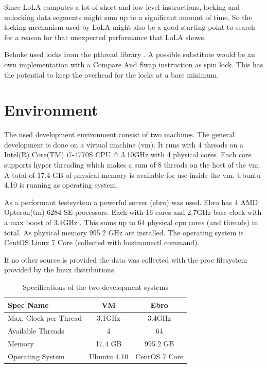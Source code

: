 Since LoLA computes a lot of short and low level instructions, locking and unlocking data segments might sum up to a significant amount of time. So the locking mechanism used by LoLA might also be a good starting point to search for a reason for that unexpected performance that LoLA shows.

Behnke used locks from the pthread library \cite{?}. A possible substitute would be an own implementation with a Compare And Swap instruction as spin lock. This has the potential to keep the overhead for the locks at a bare minimum.

\section{Environment}
\label{env}
The used development environment consist of two machines. The general development is done on a virtual machine (vm). It runs with 4 threads on a Intel(R) Core(TM) i7-4770S CPU @ 3.10GHz with 4 physical cores. Each core supports hyper threading which makes a sum of 8 threads on the host of the vm. A total of 17.4 GB of physical memory is available for use inside the vm. Ubuntu 4.10 is running as operating system.

As a performant testsystem a powerful server (ebro) was used. Ebro has 4 AMD Opteron(tm) 6284 SE processors. Each with 16 cores and 2.7GHz base clock with a max boost of 3.4GHz \cite{AMDSpecs}. This sums up to 64 physical cpu cores (and threads) in total. As physical memory 995.2 GHz are installed. The operating system is CentOS Linux 7 Core (collected with hostnamectl command).

If no other source is provided the data was collected with the proc filesystem provided by the linux distributions.
\begin{center}
    \begin{table}[H]
        \centering
        \begin{tabular}{ | l | c | c |}
            \hline
            \textbf{Spec Name} & \textbf{VM} & \textbf{Ebro} \\ \hline
            Max. Clock per Thread & 3.1GHz & 3.4GHz \\ 
            Available Threads & 4 & 64 \\ 
            Memory & 17.4 GB & 995.2 GB\\ 
            Operating System & Ubuntu 4.10 & CentOS 7 Core \\ \hline
        \end{tabular}
        \caption{Specifications of the two development systems}
    \end{table}
\end{center}

